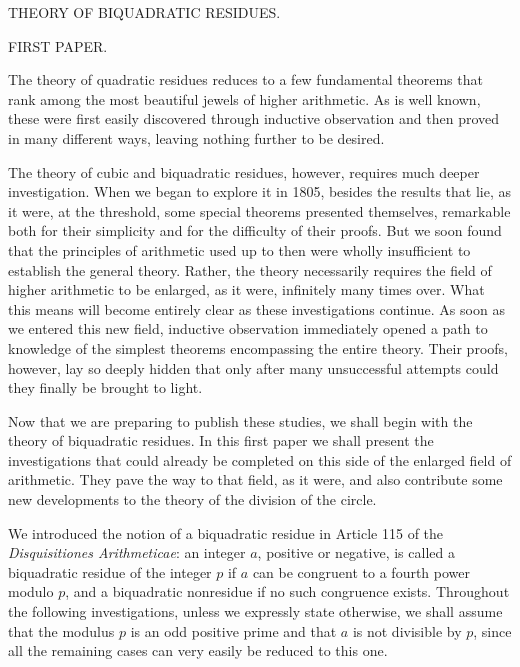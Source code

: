 %
\begin{center}
{\large THEORY OF BIQUADRATIC RESIDUES.\par}
\bigskip FIRST PAPER.
\end{center}
\BookRule{28mm}

The theory of quadratic residues reduces to a few fundamental theorems that rank among the most beautiful jewels of higher arithmetic. As is well known, these were first easily discovered through inductive observation and then proved in many different ways, leaving nothing further to be desired.

The theory of cubic and biquadratic residues, however, requires much deeper investigation. When we began to explore it in 1805, besides the results that lie, as it were, at the threshold, some special theorems presented themselves, remarkable both for their simplicity and for the difficulty of their proofs. But we soon found that the principles of arithmetic used up to then were wholly insufficient to establish the general theory. Rather, the theory necessarily requires the field of higher arithmetic to be enlarged, as it were, infinitely many times over. What this means will become entirely clear as these investigations continue. As soon as we entered this new field, inductive observation immediately opened a path to knowledge of the simplest theorems encompassing the entire theory. Their proofs, however, lay so deeply hidden that only after many unsuccessful attempts could they finally be brought to light.

Now that we are preparing to publish these studies, we shall begin with the theory of biquadratic residues. In this first paper\space{}%
 we shall present the investigations that could already be completed on this side of the enlarged field of arithmetic. They pave the way to that field, as it were, and also contribute some new developments to the theory of the division of the circle.

We introduced the notion of a biquadratic residue in Article 115 of the \emph{Disquisitiones Arithmeticae}: an integer $a$, positive or negative, is called a biquadratic residue of the integer $p$ if $a$ can be congruent to a fourth power modulo $p$, and a biquadratic nonresidue if no such congruence exists. Throughout the following investigations, unless we expressly state otherwise, we shall assume that the modulus $p$ is an odd positive prime and that $a$ is not divisible by $p$, since all the remaining cases can very easily be reduced to this one.

